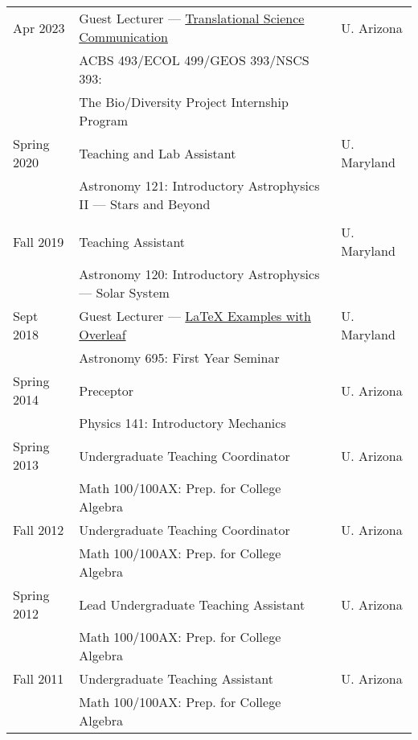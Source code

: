 \documentclass[11pt]{article}
\begin{document}
\begin{longtable}{p{} p{}p{}}

Apr 2023 & Guest Lecturer --- \href{https://github.com/rclevy/rclevy.github.io/blob/master/assets/pdf/BioDiversity_GuestLecture_TranslationalSciComm_RLevy_20230405.pdf}{Translational Science Communication} &{\small U. Arizona}\\
& ACBS 493/ECOL 499/GEOS 393/NSCS 393: & \\
&The Bio/Diversity Project Internship Program\medskip&\\

Spring 2020 & Teaching and Lab Assistant & {\small U. Maryland}\\
& Astronomy 121: Introductory Astrophysics II --- Stars and Beyond\\
& \medskip&\\

Fall 2019 & Teaching Assistant & {\small U. Maryland}\\
 & Astronomy 120: Introductory Astrophysics --- Solar System\medskip & \\

Sept 2018 & Guest Lecturer --- \href{https://github.com/rclevy/LaTeX-Examples-with-Overleaf-for-ASTR-695}{LaTeX Examples with Overleaf} & {\small U. Maryland}\\
& Astronomy 695: First Year Seminar \medskip&\\

Spring 2014 & Preceptor & \small {U. Arizona}\\
& Physics 141: Introductory Mechanics\medskip&\\

Spring 2013 & Undergraduate Teaching Coordinator & {\small U. Arizona} \\
& Math 100/100AX: Prep. for College Algebra \medskip\\

Fall 2012 & Undergraduate Teaching Coordinator & {\small U. Arizona}\\
& Math 100/100AX: Prep. for College Algebra \medskip\\

Spring 2012 & Lead Undergraduate Teaching Assistant &  {\small U. Arizona}\\
& Math 100/100AX: Prep. for College Algebra \medskip\\

Fall 2011 & Undergraduate Teaching Assistant & {\small U. Arizona} \\
& Math 100/100AX: Prep. for College Algebra \medskip\\
\end{longtable}
\end{document}
